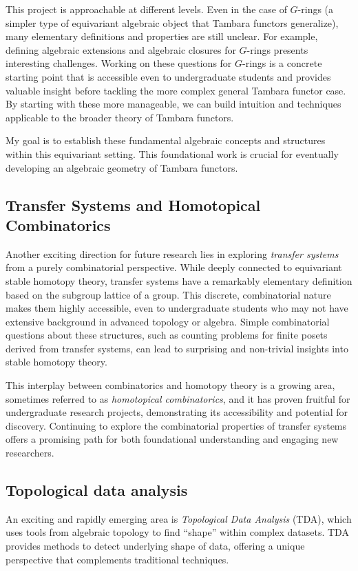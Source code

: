 \documentclass[11pt]{article}
\begin{document}
This project is approachable at different levels. Even in the case of $G$-rings (a simpler type of equivariant algebraic object that Tambara functors generalize), many elementary definitions and properties are still unclear. For example, defining algebraic extensions and algebraic closures for $G$-rings presents interesting challenges. Working on these questions for $G$-rings is a concrete starting point that is accessible even to undergraduate students and provides valuable insight before tackling the more complex general Tambara functor case. By starting with these more manageable, we can build intuition and techniques applicable to the broader theory of Tambara functors.

My goal is to establish these fundamental algebraic concepts and structures within this equivariant setting. This foundational work is crucial for eventually developing an algebraic geometry of Tambara functors.

\subsection*{Transfer Systems and Homotopical Combinatorics}
Another exciting direction for future research lies in exploring {\it transfer systems} from a purely combinatorial perspective. While deeply connected to equivariant stable homotopy theory, transfer systems have a remarkably elementary definition based on the subgroup lattice of a group. This discrete, combinatorial nature makes them highly accessible, even to undergraduate students who may not have extensive background in advanced topology or algebra. Simple combinatorial questions about these structures, such as counting problems for finite posets derived from transfer systems, can lead to surprising and non-trivial insights into stable homotopy theory. 

This interplay between combinatorics and homotopy theory is a growing area, sometimes referred to as {\it homotopical combinatorics}, and it has proven fruitful for undergraduate research projects, demonstrating its accessibility and potential for discovery. Continuing to explore the combinatorial properties of transfer systems offers a promising path for both foundational understanding and engaging new researchers.

\subsection*{Topological data analysis}
An exciting and rapidly emerging area is {\it Topological Data Analysis} (TDA), which uses tools from algebraic topology to find ``shape'' within complex datasets. TDA provides methods to detect underlying shape of data, offering a unique perspective that complements traditional techniques.
\end{document}
